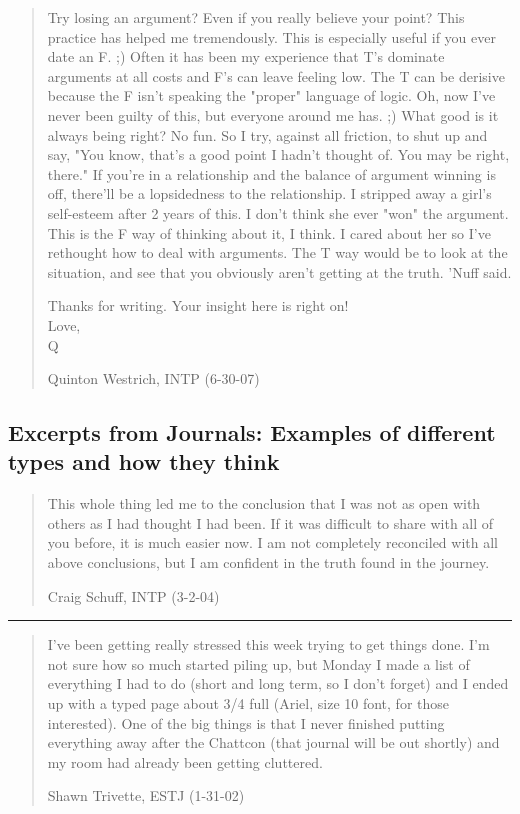 \begin{quotation}
Try losing an argument? Even if you really believe your point? This practice has helped me tremendously. This is especially useful if you ever date an F. ;) Often it has been my experience that T's dominate arguments at all costs and F's can leave feeling low. The T can be derisive because the F isn't speaking the "proper" language of logic. Oh, now I've never been guilty of this, but everyone around me has. ;) What good is it always being right? No fun. So I try, against all friction, to shut up and say, "You know, that's a good point I hadn't thought of. You may be right, there." If you're in a relationship and the balance of argument winning is off, there'll be a lopsidedness to the relationship. I stripped away a girl's self-esteem after 2 years of this. I don't think she ever "won" the argument. This is the F way of thinking about it, I think. I cared about her so I've rethought how to deal with arguments. The T way would be to look at the situation, and see that you obviously aren't getting at the truth. 'Nuff said.

Thanks for writing. Your insight here is right on! \\
Love, \\
Q \\
\begin{flushright}
	Quinton Westrich, INTP (6-30-07)
\end{flushright}
\end{quotation}

\subsection{Excerpts from Journals: Examples of different types and how they think}

\begin{quotation}
This whole thing led me to the conclusion that I was not as open with others as I had thought I had been. If it was difficult to share with all of you before, it is much easier now. I am not completely reconciled with all above conclusions, but I am confident in the truth found in the journey.
\begin{flushright}
	Craig Schuff, INTP (3-2-04)
\end{flushright}
\end{quotation}

\noindent\rule{\linewidth}{1pt}

\begin{quotation}
 I've been getting really stressed this week trying to get things done. I'm not sure how so much started piling up, but Monday I made a list of everything I had to do (short and long term, so I don't forget) and I ended up with a typed page about 3/4 full (Ariel, size 10 font, for those interested). One of the big things is that I never finished putting everything away after the Chattcon (that journal will be out shortly) and my room had already been getting cluttered.
\begin{flushright}
	Shawn Trivette, ESTJ (1-31-02)
\end{flushright}
\end{quotation}

